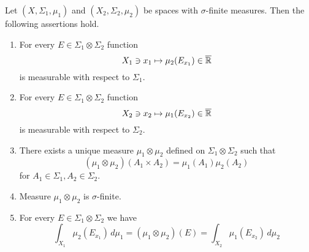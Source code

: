 \begin{theorem}\label{theorem:fubinis_theorem_basic}
Let $(X,\Sigma_1,\mu_1)$ and $(X_2,\Sigma_2,\mu_2)$ be spaces with $\sigma$-finite measures. Then the following assertions hold.
\begin{enumerate}[label=\emph{\textbf{(\arabic*)}}, leftmargin=*]
\item For every $E\in \Sigma_1\otimes \Sigma_2$ function
$$X_1\ni x_1\mapsto \mu_2(E_{x_1})\in \overline{{\mathbb R}}$$
is measurable with respect to $\Sigma_1$.
\item For every $E\in \Sigma_1\otimes \Sigma_2$ function
$$X_2\ni x_2\mapsto \mu_1(E_{x_2})\in \overline{{\mathbb R}}$$
is measurable with respect to $\Sigma_2$.
\item There exists a unique measure $\mu_1\otimes \mu_2$ defined on $\Sigma_1\otimes \Sigma_2$ such that
$$\left(\mu_1\otimes \mu_2\right)\left(A_1\times A_2\right) = \mu_1(A_1)\mu_2(A_2)$$
for $A_1\in \Sigma_1, A_2\in \Sigma_2$.
\item Measure $\mu_1\otimes \mu_2$ is $\sigma$-finite.
\item For every $E\in \Sigma_1\otimes \Sigma_2$ we have
$$\int_{X_1}\mu_2(E_{x_1})\,d\mu_1 = \left(\mu_1\otimes \mu_2\right)(E) = \int_{X_2}\mu_1(E_{x_2})\,d\mu_2$$
\end{enumerate}
\end{theorem}
